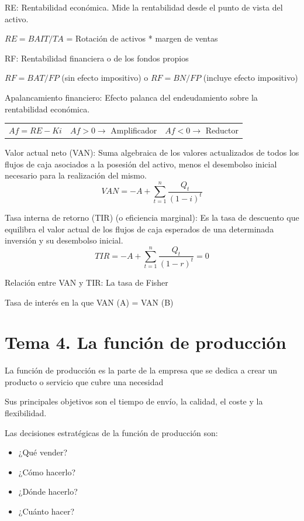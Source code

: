 \documentclass[12pt, twoside, openright]{report} %
\begin{document}
RE: Rentabilidad económica. Mide la rentabilidad desde el punto de vista del activo.

$RE = BAIT / TA$ = Rotación de activos * margen de ventas

RF: Rentabilidad financiera o de los fondos propios

$RF = BAT / FP$ (sin efecto impositivo) o $RF = BN / FP$ (incluye efecto impositivo)

Apalancamiento financiero: Efecto palanca del endeudamiento sobre la rentabilidad económica.
\begin{table}[H]
	\begin{tabular}{lll}
$Af = RE - Ki$ & $Af > 0 \rightarrow$ Amplificador & $Af < 0 \rightarrow$ Reductor
	\end{tabular}
\end{table}


Valor actual neto (VAN): Suma algebraica de los valores actualizados de todos los flujos de caja asociados a
la posesión del activo, menos el desembolso inicial necesario para la realización del mismo.
$$VAN = -A + \sum\limits_{t=1}^n \frac{Q_t}{(1-i)^t}$$

Tasa interna de retorno (TIR) (o eficiencia marginal): Es la tasa de descuento que equilibra el valor actual de
los flujos de caja esperados de una determinada inversión y su desembolso inicial.
$$TIR = -A + \sum\limits_{t=1}^n \frac{Q_t}{(1-r)^t}=0$$

Relación entre VAN y TIR: La tasa de Fisher

Tasa de interés en la que VAN (A) = VAN (B)



\chapter{Tema 4. La función de producción}
La función de producción es la parte de la empresa que se dedica a crear un producto o servicio que cubre una necesidad 

Sus principales objetivos son el tiempo de envío, la calidad, el coste y la flexibilidad.

Las decisiones estratégicas de la función de producción son:
\begin{itemize}
	\item ¿Qué vender?
	\item ¿Cómo hacerlo?
	\item ¿Dónde hacerlo?
	\item ¿Cuánto hacer?
\end{itemize}
\end{document}
